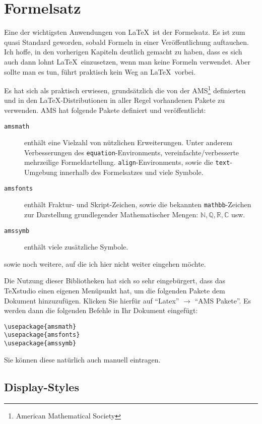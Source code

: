 
\chapter{Formelsatz}\label{chap:formel}

Eine der wichtigsten Anwendungen von \LaTeX\ ist der Formelsatz. Es ist zum quasi Standard geworden, sobald Formeln in einer Veröffentlichung auftauchen. Ich hoffe, in den vorherigen Kapiteln deutlich gemacht zu haben, dass es sich auch dann lohnt \LaTeX\ einzusetzen, wenn man keine Formeln verwendet. Aber sollte man es tun, führt praktisch kein Weg an \LaTeX\ vorbei.

Es hat sich als praktisch erwiesen, grundsätzlich die von der AMS\footnote{American Mathematical Society} definierten und in den \LaTeX-Distributionen in aller Regel vorhandenen Pakete zu verwenden. AMS hat folgende Pakete definiert und veröffentlicht:

\begin{description}
\item[\texttt{amsmath}] enthält eine Vielzahl von nützlichen Erweiterungen. Unter anderem Verbesserungen des \texttt{equation}-Environments, vereinfachte/verbesserte mehrzeilige Formeldartellung. \texttt{align}-Environments, sowie die \texttt{text}-Umgebung innerhalb des Formelsatzes und viele Symbole.
\item[\texttt{amsfonts}] enthält Fraktur- und Skript-Zeichen, sowie die bekannten \texttt{mathbb}-Zeichen zur Darstellung grundlegender Mathematischer Mengen: $\mathbb{N}, \mathbb{Q}, \mathbb{R}, \mathbb{C}$ usw.
\item[\texttt{amssymb}] enthält viele zusätzliche Symbole.

\end{description}
sowie noch weitere, auf die ich hier nicht weiter eingehen möchte.

Die Nutzung dieser Bibliotheken hat sich so sehr eingebürgert, dass das TeXstudio einen eigenen Menüpunkt hat, um die folgenden Pakete dem Dokument hinzuzufügen. Klicken Sie hierfür auf "`Latex"' $\rightarrow$ "`AMS Pakete"'. Es werden dann die folgenden Befehle in Ihr Dokument eingefügt:

\begin{verbatim}
\usepackage{amsmath}
\usepackage{amsfonts}
\usepackage{amssymb}
\end{verbatim}
Sie können diese natürlich auch manuell eintragen.

\section{Display-Styles}

